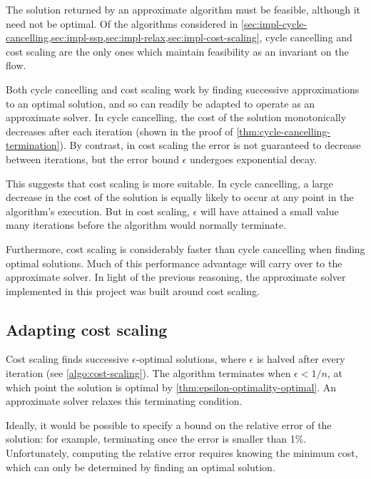 The solution returned by an approximate algorithm must be feasible, although it need not be optimal. Of the algorithms considered in \cref{sec:impl-cycle-cancelling,sec:impl-ssp,sec:impl-relax,sec:impl-cost-scaling}, cycle cancelling and cost scaling are the only ones which maintain feasibility as an invariant on the flow\footnotemark.

Both cycle cancelling and cost scaling work by finding successive approximations to an optimal solution, and so can readily be adapted to operate as an approximate solver. In cycle cancelling, the cost of the solution monotonically decreases after each iteration (shown in the proof of \cref{thm:cycle-cancelling-termination}). By contrast, in cost scaling the error is not guaranteed to decrease between iterations, but the error bound $\epsilon$ undergoes exponential decay.

This suggests that cost scaling is more suitable. In cycle cancelling, a large decrease in the cost of the solution is equally likely to occur at any point in the algorithm's execution. But in cost scaling, $\epsilon$ will have attained a small value many iterations before the algorithm would normally terminate. 

Furthermore, cost scaling is considerably faster than cycle cancelling when finding optimal solutions. Much of this performance advantage will carry over to the approximate solver. In light of the previous reasoning, the approximate solver implemented in this project was built around cost scaling.

\subsection{Adapting cost scaling}

Cost scaling finds successive $\epsilon$-optimal solutions, where $\epsilon$ is halved after every iteration (see \cref{algo:cost-scaling}). The algorithm terminates when $\epsilon < 1/n$, at which point the solution is optimal by \cref{thm:epsilon-optimality-optimal}. An approximate solver relaxes this terminating condition.

Ideally, it would be possible to specify a bound on the relative error of the solution: for example, terminating once the error is smaller than 1\%. Unfortunately, computing the relative error requires knowing the minimum cost, which can only be determined by finding an optimal solution.

